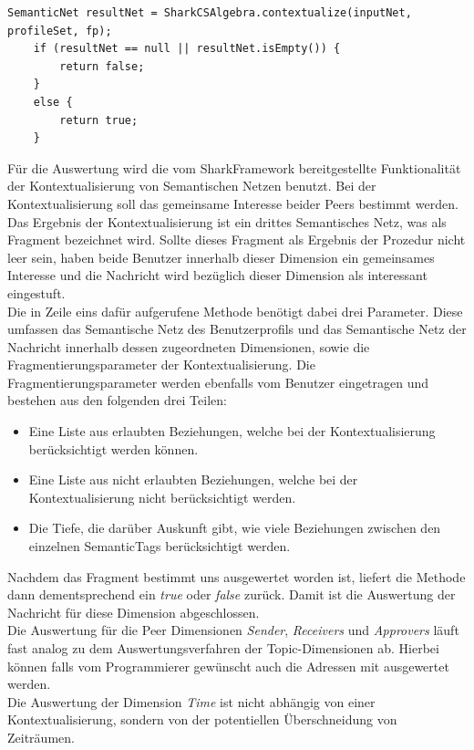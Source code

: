\begin{lstlisting}
SemanticNet resultNet = SharkCSAlgebra.contextualize(inputNet, profileSet, fp);
	if (resultNet == null || resultNet.isEmpty()) {
		return false;
	}
	else {
		return true;
	}
\end{lstlisting}
Für die Auswertung wird die vom SharkFramework bereitgestellte Funktionalität der Kontextualisierung von Semantischen Netzen benutzt. Bei der Kontextualisierung soll das gemeinsame Interesse beider Peers bestimmt werden. Das Ergebnis der Kontextualisierung ist ein drittes Semantisches Netz, was als Fragment bezeichnet wird. Sollte dieses Fragment als Ergebnis der Prozedur nicht leer sein, haben beide Benutzer innerhalb dieser Dimension ein gemeinsames Interesse und die Nachricht wird bezüglich dieser Dimension als interessant eingestuft.
\\Die in Zeile eins dafür aufgerufene Methode benötigt dabei drei Parameter. Diese umfassen das Semantische Netz des Benutzerprofils und das Semantische Netz der Nachricht innerhalb dessen zugeordneten Dimensionen, sowie die Fragmentierungsparameter der Kontextualisierung. Die Fragmentierungsparameter werden ebenfalls vom Benutzer eingetragen und bestehen aus den folgenden drei Teilen:
\begin{itemize}
	\item Eine Liste aus erlaubten Beziehungen, welche bei der Kontextualisierung berücksichtigt werden können.
	\item Eine Liste aus nicht erlaubten Beziehungen, welche bei der Kontextualisierung nicht berücksichtigt werden.
	\item Die Tiefe, die darüber Auskunft gibt, wie viele Beziehungen zwischen den einzelnen SemanticTags berücksichtigt werden.
\end{itemize}
Nachdem das Fragment bestimmt uns ausgewertet worden ist, liefert die Methode dann dementsprechend ein \textit{true} oder \textit{false} zurück. Damit ist die Auswertung der Nachricht für diese Dimension abgeschlossen.
\\Die Auswertung für die Peer Dimensionen \textit{Sender}, \textit{Receivers} und \textit{Approvers} läuft fast analog zu dem Auswertungsverfahren der Topic-Dimensionen ab. Hierbei können falls vom Programmierer gewünscht auch die Adressen mit ausgewertet werden. 
\\Die Auswertung der Dimension \textit{Time} ist nicht abhängig von einer Kontextualisierung, sondern von der potentiellen Überschneidung von Zeiträumen.
\lstset{language=Java, caption=Auswertung der Time-Dimension (Auszug), label=DescriptiveLabel, numbers=left, numbersep=1em, breaklines=true, basicstyle=\small}
